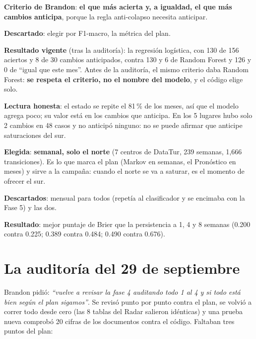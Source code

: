 \begin{opciones}
\textbf{Criterio de Brandon}: \textbf{el que más acierta y, a igualdad, el que más cambios anticipa}, porque la regla
anti-colapso necesita anticipar.

\textbf{Descartado}: elegir por F1-macro, la métrica del plan.

\textbf{Resultado vigente} (tras la auditoría): la regresión logística, con 130 de 156 aciertos y 8 de 30 cambios
anticipados, contra 130 y 6 de Random Forest y 126 y 0 de ``igual que este mes''. Antes de la auditoría, el mismo criterio
daba Random Forest: \textbf{se respeta el criterio, no el nombre del modelo}, y el código elige solo.

\textbf{Lectura honesta}: el estado se repite el 81\,\% de los meses, así que el modelo agrega poco; su valor está en los
cambios que anticipa. En los 5 lugares hubo solo 2 cambios en 48 casos y no anticipó ninguno: no se puede afirmar que
anticipe saturaciones del sur.
\end{opciones}

\begin{opciones}
\textbf{Elegida}: \textbf{semanal, solo el norte} (7 centros de DataTur, 239 semanas, 1,666 transiciones). Es lo que marca el
plan (Markov en semanas, el Pronóstico en meses) y sirve a la campaña: cuando el norte se va a saturar, es el momento de
ofrecer el sur.

\textbf{Descartados}: mensual para todos (repetía al clasificador y se encimaba con la Fase 5) y las dos.

\textbf{Resultado}: mejor puntaje de Brier que la persistencia a 1, 4 y 8 semanas (0.200 contra 0.225; 0.389 contra 0.484;
0.490 contra 0.676).
\end{opciones}

\section*{La auditoría del 29 de septiembre}
Brandon pidió: \emph{``vuelve a revisar la fase 4 auditando todo 1 al 4 y si todo está bien según el plan sigamos''}. Se
revisó punto por punto contra el plan, se volvió a correr todo desde cero (las 8 tablas del Radar salieron idénticas) y una
prueba nueva comprobó 20 cifras de los documentos contra el código. Faltaban tres puntos del plan:

